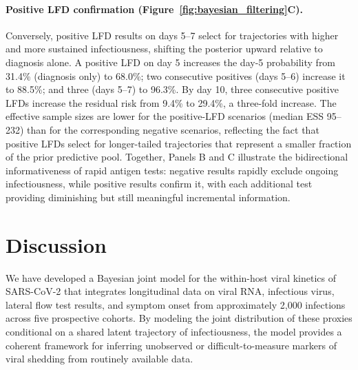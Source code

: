 \documentclass[12pt]{article}
\begin{document}
\paragraph{Positive LFD confirmation (Figure~\ref{fig:bayesian_filtering}C).} Conversely, positive LFD results on days 5--7 select for trajectories with higher and more sustained infectiousness, shifting the posterior upward relative to diagnosis alone. A positive LFD on day 5 increases the day-5 probability from 31.4\% (diagnosis only) to 68.0\%; two consecutive positives (days 5--6) increase it to 88.5\%; and three (days 5--7) to 96.3\%. By day 10, three consecutive positive LFDs increase the residual risk from 9.4\% to 29.4\%, a three-fold increase. The effective sample sizes are lower for the positive-LFD scenarios (median ESS 95--232) than for the corresponding negative scenarios, reflecting the fact that positive LFDs select for longer-tailed trajectories that represent a smaller fraction of the prior predictive pool. Together, Panels B and C illustrate the bidirectional informativeness of rapid antigen tests: negative results rapidly exclude ongoing infectiousness, while positive results confirm it, with each additional test providing diminishing but still meaningful incremental information.

\section{Discussion} \label{sec:discussion}

We have developed a Bayesian joint model for the within-host viral kinetics of SARS-CoV-2 that integrates longitudinal data on viral RNA, infectious virus, lateral flow test results, and symptom onset from approximately 2{,}000 infections across five prospective cohorts. By modeling the joint distribution of these proxies conditional on a shared latent trajectory of infectiousness, the model provides a coherent framework for inferring unobserved or difficult-to-measure markers of viral shedding from routinely available data.
\end{document}
